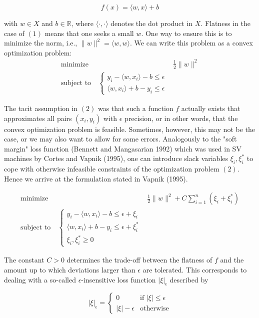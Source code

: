 \documentclass[fleqn,10pt]{olplainarticle}
\begin{document}
\[f(x) = \langle w, x \rangle + b\]


with $w \in X$ and $b \in \mathbb{R}$, where $\langle \cdot, \cdot \rangle$ denotes the dot product in $X$. Flatness in the case of $(1)$ means that one seeks a small $w$. One way to ensure this is to minimize the norm, i.e., $\|w\|^2 = \langle w, w \rangle$. We can write this problem as a convex optimization problem:
\[
\begin{aligned}
    \text{minimize} \quad & \frac{1}{2} \|w\|^2  \\
    \text{subject to} \quad
    \begin{cases}
    y_i - \langle w, x_i \rangle - b \leq \epsilon \\
    \langle w, x_i \rangle + b - y_i \leq \epsilon
    \end{cases}
\end{aligned}
\]

The tacit assumption in $(2)$ was that such a function $f$ actually exists that approximates all pairs $(x_i, y_i)$ with $\epsilon$ precision, or in other words, that the convex optimization problem is feasible. Sometimes, however, this may not be the case, or we may also want to allow for some errors. Analogously to the "soft margin" loss function (Bennett and Mangasarian 1992) which was used in SV machines by Cortes and Vapnik (1995), one can introduce slack variables $\xi_i, \xi_i^*$ to cope with otherwise infeasible constraints of the optimization problem $(2)$. Hence we arrive at the formulation stated in Vapnik (1995).

\[
\begin{aligned}
    \text{minimize} \quad & \frac{1}{2} \|w\|^2 + C \sum_{i=1}^n (\xi_i + \xi_i^*) \\
    \text{subject to} \quad 
    \begin{cases}
    y_i - \langle w, x_i \rangle - b \leq \epsilon + \xi_i \\
    \langle w, x_i \rangle + b - y_i \leq \epsilon + \xi_i^* \\
    \xi_i, \xi_i^* \geq 0
    \end{cases}
\end{aligned}
\]

The constant $C > 0$ determines the trade-off between the flatness of $f$ and the amount up to which deviations larger than $\epsilon$ are tolerated. This corresponds to dealing with a so-called $\epsilon$-insensitive loss function $|\xi|_\epsilon$ described by

\[
|\xi|_\epsilon =
\begin{cases}
    0 & \text{if } |\xi| \leq \epsilon \\
    |\xi| - \epsilon & \text{otherwise}
\end{cases}
\]
\end{document}

